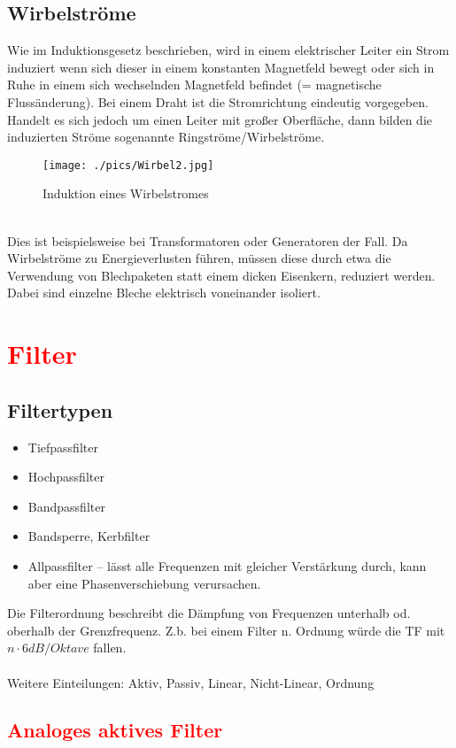 		\subsection{Wirbelströme}
			Wie im Induktionsgesetz beschrieben, wird in einem elektrischer Leiter ein Strom induziert wenn sich dieser in einem konstanten Magnetfeld bewegt oder sich in Ruhe in einem sich wechselnden Magnetfeld befindet (= magnetische Flussänderung). Bei einem Draht ist die Stromrichtung eindeutig vorgegeben. Handelt es sich jedoch um einen Leiter mit großer Oberfläche, dann bilden die induzierten Ströme sogenannte Ringströme/Wirbelströme. 
			\begin{figure}[h]
				\centering
				\texttt{[image: ./pics/Wirbel2.jpg]}
				\caption{Induktion eines Wirbelstromes}
			\end{figure}
			\leavevmode \\
			Dies ist beispielsweise bei Transformatoren oder Generatoren der Fall. Da Wirbelströme zu Energieverlusten führen, müssen diese durch etwa die Verwendung von Blechpaketen statt einem dicken Eisenkern, reduziert werden. Dabei sind einzelne Bleche elektrisch voneinander isoliert.
			
	\section{\textcolor{red}{Filter}}
		\subsection{Filtertypen}
		\begin{itemize}
			\item Tiefpassfilter
			\item Hochpassfilter
			\item Bandpassfilter
			\item Bandsperre, Kerbfilter
			\item Allpassfilter – lässt alle Frequenzen mit gleicher Verstärkung durch, kann aber eine Phasenverschiebung verursachen.
		\end{itemize}
		Die Filterordnung beschreibt die Dämpfung von Frequenzen unterhalb od. oberhalb der Grenzfrequenz. Z.b. bei einem Filter n. Ordnung würde die TF mit $ n\cdot6dB/Oktave $ fallen.\\\\
		Weitere Einteilungen: Aktiv, Passiv, Linear, Nicht-Linear, Ordnung
		\subsection{\textcolor{red}{Analoges aktives Filter}}
